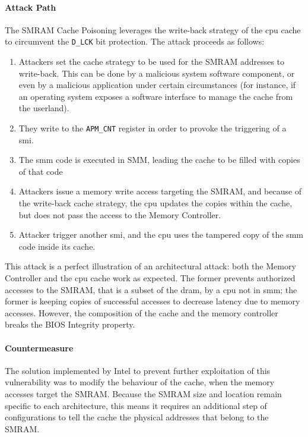 \paragraph{Attack Path}
%
The SMRAM Cache Poisoning leverages the write-back strategy of the \ac{cpu}
cache to circumvent the \texttt{D\_LCK} bit protection.
%
The attack proceeds as follows:

\begin{enumerate}
\item Attackers set the cache strategy to be used for the SMRAM addresses to
  write-back.
  This can be done by a malicious system software component, or even by a
  malicious application under certain circumstances (for instance, if an
  operating system exposes a software interface to manage the cache from the
  userland).

%
\item They write to the \texttt{APM\_CNT} register in order to provoke the
  triggering of a \ac{smi}.
%
\item The \ac{smm} code is executed in SMM, leading the cache to be filled with
  copies of that code
%
\item Attackers issue a memory write access targeting the SMRAM, and because of
  the write-back cache strategy, the \ac{cpu} updates the copies within the
  cache, but does not pass the access to the Memory Controller.
%
\item Attacker trigger another \ac{smi}, and the \ac{cpu} uses the tampered copy
  of the \ac{smm} code inside its cache.
\end{enumerate}
%
This attack is a perfect illustration of an architectural attack:
%
both the Memory Controller and the \ac{cpu} cache work as expected.
%
The former prevents authorized accesses to the SMRAM, that is a subset of the
\ac{dram}, by a \ac{cpu} not in \ac{smm};
%
the former is keeping copies of successful accesses to decrease latency due to
memory accesses.
%
However, the composition of the cache and the memory controller breaks the BIOS
Integrity property.

\paragraph{Countermeasure}
%
The solution implemented by Intel to prevent further exploitation of this
vulnerability was to modify the behaviour of the cache, when the memory accesses
target the SMRAM.
%
Because the SMRAM size and location remain specific to each architecture, this
means it requires an additional step of configurations to tell the cache the
physical addresses that belong to the SMRAM.

